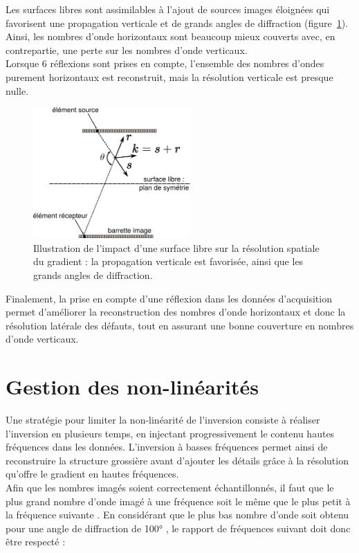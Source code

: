 Les surfaces libres sont assimilables à l'ajout de sources images éloignées qui favorisent une propagation verticale et de grands angles de diffraction (figure~\ref{app:reso_surf_libre}). Ainsi, les nombres d'onde horizontaux sont beaucoup mieux couverts avec, en contrepartie, une perte sur les nombres d'onde verticaux.  \\
Lorsque 6 réflexions sont prises en compte, l'ensemble des nombres d'ondes purement horizontaux est reconstruit, mais la résolution verticale est presque nulle.
\begin{figure}[!h]
	\centering
	\includegraphics[height=5cm]{img/reso_surf_libre.png}
	\caption{Illustration de l'impact d'une surface libre sur la résolution spatiale du gradient : la propagation verticale est favorisée, ainsi que les grands angles de diffraction.\label{app:reso_surf_libre}}
\end{figure}



Finalement, la prise en compte d'une réflexion dans les données d'acquisition permet d'améliorer la reconstruction des nombres d'onde horizontaux et donc la résolution latérale des défauts, tout en assurant une bonne couverture en nombres d'onde verticaux.


\section{Gestion des non-linéarités}
Une stratégie pour limiter la non-linéarité de l'inversion consiste à réaliser l'inversion en plusieurs temps, en injectant progressivement le contenu hautes fréquences dans les données. L'inversion à basses fréquences permet ainsi de reconstruire la structure grossière avant d'ajouter les détails grâce à la résolution qu'offre le gradient en hautes fréquences.\\



Afin que les nombres imagés soient correctement échantillonnés, il faut que le plus grand nombre d'onde imagé à une fréquence soit le même que le plus petit à la fréquence suivante \citep{sirgue}. En considérant que le plus bas nombre d'onde soit obtenu pour une angle de diffraction de 100° , le rapport de fréquences suivant doit donc être respecté : 


